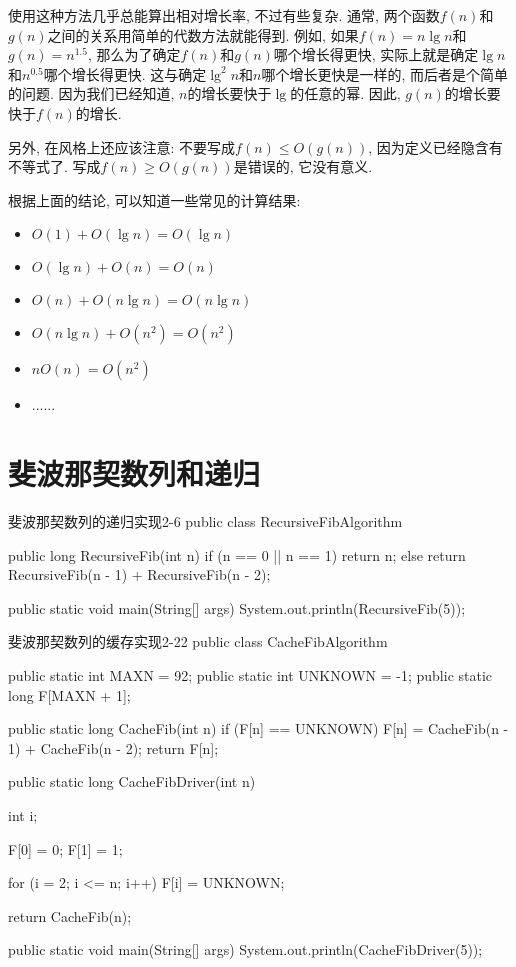 \documentclass[oneside,10pt,fontset=none]{ctexbook}
\numberwithin{definition}{chapter}
\numberwithin{theorem}{chapter}
\numberwithin{lemma}{chapter}
\begin{document}
使用这种方法几乎总能算出相对增长率, 不过有些复杂. 通常, 两个函数$f(n)$和$g(n)$之间的关系用简单的代数方法就能得到. 例如, 如果$f(n)=n\lg{n}$和$g(n)=n^{1.5}$, 那么为了确定$f(n)$和$g(n)$哪个增长得更快, 实际上就是确定$\lg{n}$和$n^{0.5}$哪个增长得更快. 这与确定$\lg^2n$和$n$哪个增长更快是一样的, 而后者是个简单的问题. 因为我们已经知道, $n$的增长要快于$\lg$的任意的幂. 因此, $g(n)$的增长要快于$f(n)$的增长.

另外, 在风格上还应该注意: 不要写成$f(n)\leq O(g(n))$, 因为定义已经隐含有不等式了. 写成$f(n)\geq O(g(n))$是错误的, 它没有意义.

根据上面的结论, 可以知道一些常见的计算结果:

\begin{itemize}
    \item $O(1) + O(\lg{n}) = O(\lg{n})$
    \item $O(\lg{n}) + O(n) = O(n)$
    \item $O(n) + O(n\lg{n}) = O(n\lg{n})$
    \item $O(n\lg{n}) + O(n^2) = O(n^2)$
    \item $nO(n) = O(n^2)$
    \item ......
\end{itemize}

\section{斐波那契数列和递归}

\begin{myjava}{}{斐波那契数列的递归实现}{2-6}
public class RecursiveFibAlgorithm {
    public long RecursiveFib(int n) {
        if (n == 0 || n == 1)
            return n;
        else
            return RecursiveFib(n - 1) + RecursiveFib(n - 2);
    }

    public static void main(String[] args) {
        System.out.println(RecursiveFib(5));
    }
}
\end{myjava}

\begin{myjava}{}{斐波那契数列的缓存实现}{2-22}
public class CacheFibAlgorithm {
    public static int MAXN = 92;
    public static int UNKNOWN = -1;
    public static long F[MAXN + 1];
    
    public static long CacheFib(int n) {
        if (F[n] == UNKNOWN)
            F[n] = CacheFib(n - 1) + CacheFib(n - 2);
        return F[n];
    }
    
    public static long CacheFibDriver(int n) {
        int i;
    
        F[0] = 0;
        F[1] = 1;
    
        for (i = 2; i <= n; i++)
            F[i] = UNKNOWN;
        
        return CacheFib(n);
    }

    public static void main(String[] args) {
        System.out.println(CacheFibDriver(5));
    }
}
\end{myjava}
\end{document}
